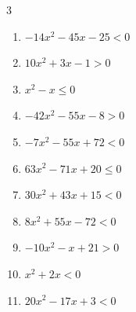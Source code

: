 \begin{multicols}{3}
\begin{enumerate}

  \item $-14x^{2}-45x-25<0$


\columnbreak %

\resetques

  \item $10x^{2}+3x-1>0$


  \item $x^{2}-x\leq 0$

        \phantom{$\displaystyle 0 \leqq x \leqq 1$}

  \item $-42x^{2}-55x-8>0$


  \item $-7x^{2}-55x+72<0$


  \item $63x^{2}-71x+20\leq 0$


  \item $30x^{2}+43x+15<0$


  \item $8x^{2}+55x-72<0$


  \item $-10x^{2}-x+21>0$


  \item $x^{2}+2x<0$

        \phantom{$\displaystyle -2 < x < 0$}

  \item $20x^{2}-17x+3<0$


\columnbreak %


\end{enumerate}
\end{multicols}
